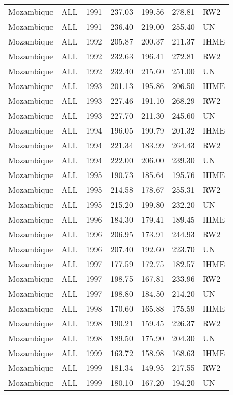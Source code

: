 \begin{longtable}{lllrrrl}
  Mozambique & ALL & 1991 & 237.03 & 199.56 & 278.81 & RW2 \\ 
  Mozambique & ALL & 1991 & 236.40 & 219.00 & 255.40 & UN \\ 
  Mozambique & ALL & 1992 & 205.87 & 200.37 & 211.37 & IHME \\ 
  Mozambique & ALL & 1992 & 232.63 & 196.41 & 272.81 & RW2 \\ 
  Mozambique & ALL & 1992 & 232.40 & 215.60 & 251.00 & UN \\ 
  Mozambique & ALL & 1993 & 201.13 & 195.86 & 206.50 & IHME \\ 
  Mozambique & ALL & 1993 & 227.46 & 191.10 & 268.29 & RW2 \\ 
  Mozambique & ALL & 1993 & 227.70 & 211.30 & 245.60 & UN \\ 
  Mozambique & ALL & 1994 & 196.05 & 190.79 & 201.32 & IHME \\ 
  Mozambique & ALL & 1994 & 221.34 & 183.99 & 264.43 & RW2 \\ 
  Mozambique & ALL & 1994 & 222.00 & 206.00 & 239.30 & UN \\ 
  Mozambique & ALL & 1995 & 190.73 & 185.64 & 195.76 & IHME \\ 
  Mozambique & ALL & 1995 & 214.58 & 178.67 & 255.31 & RW2 \\ 
  Mozambique & ALL & 1995 & 215.20 & 199.80 & 232.20 & UN \\ 
  Mozambique & ALL & 1996 & 184.30 & 179.41 & 189.45 & IHME \\ 
  Mozambique & ALL & 1996 & 206.95 & 173.91 & 244.93 & RW2 \\ 
  Mozambique & ALL & 1996 & 207.40 & 192.60 & 223.70 & UN \\ 
  Mozambique & ALL & 1997 & 177.59 & 172.75 & 182.57 & IHME \\ 
  Mozambique & ALL & 1997 & 198.75 & 167.81 & 233.96 & RW2 \\ 
  Mozambique & ALL & 1997 & 198.80 & 184.50 & 214.20 & UN \\ 
  Mozambique & ALL & 1998 & 170.60 & 165.88 & 175.59 & IHME \\ 
  Mozambique & ALL & 1998 & 190.21 & 159.45 & 226.37 & RW2 \\ 
  Mozambique & ALL & 1998 & 189.50 & 175.90 & 204.30 & UN \\ 
  Mozambique & ALL & 1999 & 163.72 & 158.98 & 168.63 & IHME \\ 
  Mozambique & ALL & 1999 & 181.34 & 149.95 & 217.55 & RW2 \\ 
  Mozambique & ALL & 1999 & 180.10 & 167.20 & 194.20 & UN \\ 

\end{longtable}
